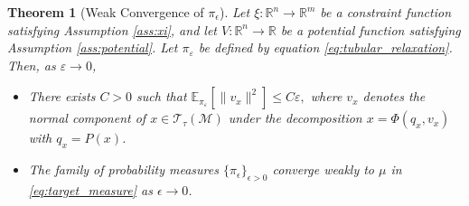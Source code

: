 \documentclass[12pt]{article}
\newtheorem{theorem}{Theorem}[section]
\begin{document}
\begin{theorem}[Weak Convergence of $\pi_\epsilon$]
\label{thm:tubular_convergence}
Let $\xi: \mathbb{R}^n \to \mathbb{R}^m$ be a constraint function satisfying Assumption \ref{ass:xi}, and let $V: \mathbb{R}^n \to \mathbb{R}$ be a potential function satisfying Assumption \ref{ass:potential}. Let $\pi_\varepsilon$ be defined by equation \eqref{eq:tubular_relaxation}. Then, as $\varepsilon \to 0$,
\begin{itemize}
    \item[(i)] There exists $C > 0$ such that
    \(
    \mathbb{E}_{\pi_\varepsilon}\left[\|v_x\|^2\right] \le C\varepsilon,
    \)
    where $v_x$ denotes the normal component of $x\in\mathcal{T}_\tau(\mathcal{M})$ under the decomposition $x = \Phi(q_x, v_x)$ with $q_x = P(x)$.
    
    \item[(ii)] The family of probability measures $\{\pi_\epsilon\}_{\epsilon>0}$ converge weakly to $\mu$ in \eqref{eq:target_measure} as $\epsilon \rightarrow 0$.
\end{itemize}
\end{theorem}
\end{document}
